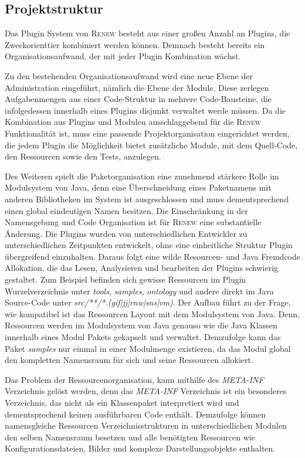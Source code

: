 	\subsection{Projektstruktur} \label{sub:projektstrukutr}
		Das Plugin System von \textsc{Renew} besteht aus einer großen Anzahl an Plugins, die Zweckorienttier kombiniert werden können. Demnach besteht bereits ein Organisationsaufwand, der mit jeder Plugin Kombination wächst. \bigbreak

		Zu den bestehenden Organisationsaufwand wird eine neue Ebene der Administration eingeführt, nämlich die Ebene der Module. Diese zerlegen Aufgabenmengen aus einer Code-Struktur in mehrere Code-Bausteine, die infolgedessen innerhalb eines Plugins disjunkt verwaltet werde müssen.\newline
		Da die Kombination aus Plugins und Modulen ausschlaggebend für die \textsc{Renew} Funktionalität ist, muss eine passende Projektorganisation eingerichtet werden, die jedem Plugin die Möglichkeit bietet zusätzliche Module, mit dem Quell-Code, den Ressourcen sowie den Tests, anzulegen.\bigbreak

		Des Weiteren spielt die Paketorganisation eine zunehmend stärkere Rolle im Modulsystem von Java, denn eine Überschneidung eines Paketnamens mit anderen Bibliotheken im System ist ausgeschlossen und muss dementsprechend einen global eindeutigen Namen besitzen. \newline
		Die Einschränkung in der Namensgebung und Code Organisation ist für \textsc{Renew} eine substantielle Änderung. Die Plugins wurden von unterschiedlichen Entwickler zu unterschiedlichen Zeitpunkten entwickelt, ohne eine einheitliche Struktur Plugin übergreifend einzuhalten. Daraus folgt eine wilde Resourcen- und Java Fremdcode Allokation, die das Lesen, Analysieren und bearbeiten der Plugins schwierig gestaltet. Zum Beispiel befinden sich gewisse Ressourcen im Plugin Wurzelverzeichnis unter \textit{tools}, \textit{samples}, \textit{ontology} und andere direkt im Java Source-Code unter \textit{src/**/*.(gif|jj|rnw|sns|vm)}. Der Aufbau führt zu der Frage, wie kompatibel ist das Ressourcen Layout mit dem Modulsystem von Java. Denn, Ressourcen werden im Modulsystem von Java genauso wie die Java Klassen innerhalb eines Modul Pakets gekapselt und verwaltet. Demzufolge kann das Paket \textit{samples} nur einmal in einer Modulmenge existieren, da das Modul global den kompletten Namensraum für sich und seine Ressourcen allokiert. \bigbreak 

		Das Problem der Ressourcenorganisation, kann mithilfe des \textit{META-INF} Verzeichnis gelöst werden, denn das \textit{META-INF} Verzeichnis ist ein besonderes Verzeichnis, das nicht als ein Klassenpaket interpretiert wird und dementsprechend keinen ausführbaren Code enthält. Demzufolge können namensgleiche Ressourcen Verzeichnisstrukturen in unterschiedlichen Modulen den selben Namensraum besetzen und alle benötigten Ressourcen wie Konfigurationsdateien, Bilder und komplexe Darstellungsobjekte enthalten.\bigbreak


